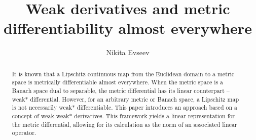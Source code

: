 \documentclass[reqno]{amsart}
\title{Weak derivatives and metric differentiability almost everywhere}
\author{Nikita Evseev}
\begin{document}
\maketitle
\begin{abstract}
It is known that a Lipschitz continuous map from the Euclidean domain to a metric space is metrically differentiable almost everywhere. When the metric space is a Banach space dual to separable, the metric differential has its linear counterpart -- weak* differential. 
However, for an arbitrary metric or Banach space, a Lipschitz map is not necessarily weak* differentiable. This paper introduces an approach based on a concept of weak weak* derivatives. This framework yields a linear representation for the metric differential, allowing for its calculation as the norm of an associated linear operator.
\end{abstract}
\end{document}
